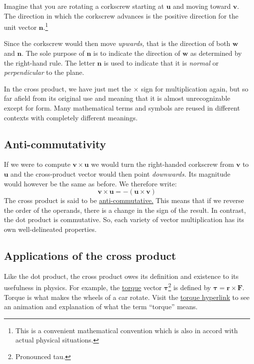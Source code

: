 \documentclass[
  a4paper,
]{article}
\begin{document}
Imagine that you are rotating a corkscrew starting at \(\mathbf{u}\) and
moving toward \(\mathbf{v}\). The direction in which the corkscrew
advances is the positive direction for the unit vector
\(\mathbf{n}\).\footnote{This is a convenient mathematical convention
  which is also in accord with actual physical situations.}

Since the corkscrew would then move \emph{upwards,} that is the
direction of both \(\mathbf{w}\) and \(\mathbf{n}\). The sole purpose of
\(\mathbf{n}\) is to indicate the direction of \(\mathbf{w}\) as
determined by the right-hand rule. The letter \(\mathbf{n}\) is used to
indicate that it is \emph{normal} or \emph{perpendicular} to the plane.

In the cross product, we have just met the \(\times\) sign for
multiplication again, but so far afield from its original use and
meaning that it is almost unrecognizable except for form. Many
mathematical terms and symbols are reused in different contexts with
completely different meanings.

\hypertarget{anti-commutativity}{%
\subsection{Anti-commutativity}\label{anti-commutativity}}

If we were to compute \(\mathbf{v} \times \mathbf{u}\) we would turn the
right-handed corkscrew from \(\mathbf{v}\) to \(\mathbf{u}\) and the
cross-product vector would then point \emph{downwards.} Its magnitude
would however be the same as before. We therefore write: \[
\mathbf{v} \times \mathbf{u} = - (\mathbf{u} \times \mathbf{v})
\] The cross product is said to be
\href{http://mathworld.wolfram.com/Anticommutative.html}{anti-commutative.}
This means that if we reverse the order of the operands, there is a
change in the sign of the result. In contrast, the dot product is
commutative. So, each variety of vector multiplication has its own
well-delineated properties.

\hypertarget{applications-of-the-cross-product}{%
\subsection{Applications of the cross
product}\label{applications-of-the-cross-product}}

Like the dot product, the cross product owes its definition and
existence to its usefulness in physics. For example, the
\href{http://en.wikipedia.org/wiki/Torque}{torque} vector
\(\symbf{\tau}\)\footnote{Pronounced tau.} is defined by
\(\symbf{\tau} = \mathbf{r}\times\mathbf{F}\). Torque is what makes the
wheels of a car rotate. Visit the
\href{http://en.wikipedia.org/wiki/Torque}{torque hyperlink} to see an
animation and explanation of what the term ``torque'' means.
\end{document}

